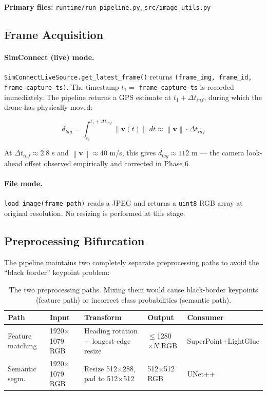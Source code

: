 \documentclass[12pt,a4paper]{article}
\newcommand{\norm}[1]{\left\lVert#1\right\rVert}
\newcommand{\bv}{\mathbf{v}}
\begin{document}
\noindent\textbf{Primary files:} \texttt{runtime/run\_pipeline.py},
\texttt{src/image\_utils.py}

\subsection{Frame Acquisition}

\paragraph{SimConnect (live) mode.}
\texttt{SimConnectLiveSource.get\_latest\_frame()} returns
\texttt{(frame\_img, frame\_id, frame\_capture\_ts)}. The timestamp
$t_1 = $ \texttt{frame\_capture\_ts} is recorded immediately. The pipeline
returns a GPS estimate at $t_1 + \Delta t_{inf}$, during which the drone has
physically moved:

\begin{equation}
    d_{lag} = \int_{t_1}^{t_1 + \Delta t_{inf}} \norm{\bv(t)}\,dt
    \approx \norm{\bv} \cdot \Delta t_{inf}
    \label{eq:inference_lag}
\end{equation}

At $\Delta t_{inf} \approx 2.8$ s and $\norm{\bv} \approx 40$ m/s, this gives
$d_{lag} \approx 112$ m --- the camera look-ahead offset observed empirically
and corrected in Phase 6.

\paragraph{File mode.}
\texttt{load\_image(frame\_path)} reads a JPEG and returns a
\texttt{uint8} RGB array at original resolution. No resizing is performed at
this stage.

\subsection{Preprocessing Bifurcation}

The pipeline maintains two completely separate preprocessing paths to avoid
the ``black border'' keypoint problem:

\begin{table}[H]
\centering
\begin{tabular}{@{}lllll@{}}
\toprule
\textbf{Path} & \textbf{Input} & \textbf{Transform} & \textbf{Output} & \textbf{Consumer} \\
\midrule
Feature matching & 1920$\times$1079 RGB & Heading rotation + longest-edge resize & ${\leq}$1280$\times N$ RGB & SuperPoint+LightGlue \\
Semantic segm.  & 1920$\times$1079 RGB & Resize 512$\times$288, pad to 512$\times$512 & 512$\times$512 RGB & UNet++ \\
\bottomrule
\end{tabular}
\caption{The two preprocessing paths. Mixing them would cause black-border
keypoints (feature path) or incorrect class probabilities (semantic path).}
\end{table}
\end{document}
